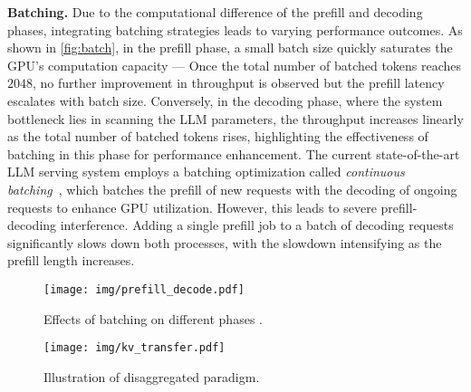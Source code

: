 \textbf{Batching.}
\label{sec:batching}
Due to the computational difference of the prefill and decoding phases, integrating batching strategies leads to varying performance outcomes. As shown in \autoref{fig:batch}, in the prefill phase, a small batch size quickly saturates the GPU's computation capacity --- Once the total number of batched tokens reaches $2048$, no further improvement in throughput is observed
but the prefill latency escalates with batch size. Conversely, in the decoding phase, where the system bottleneck lies in scanning the LLM parameters, the throughput increases linearly as the total number of batched tokens rises, highlighting the effectiveness of batching in this phase for performance enhancement.
The current state-of-the-art LLM serving system employs a batching optimization called \textit{continuous batching}~\citep{yu2022orca}, which batches the prefill of new requests with the decoding of ongoing requests to enhance GPU utilization. However, this leads to severe prefill-decoding interference. Adding a single prefill job to a batch of decoding requests significantly slows down both processes, with the slowdown intensifying as the prefill length increases.



\begin{figure}[htbp]
  \centering
  \begin{minipage}{0.49\linewidth}
    \texttt{[image: img/prefill\_decode.pdf]}
    \caption{Effects of batching on different phases .}
    \label{fig:batch}
  \end{minipage}
  \hfill
  \begin{minipage}{0.49\linewidth}
    \texttt{[image: img/kv\_transfer.pdf]}
    \caption{Illustration of disaggregated paradigm.}
    \label{fig:kv transfer}
  \end{minipage}
\end{figure}


